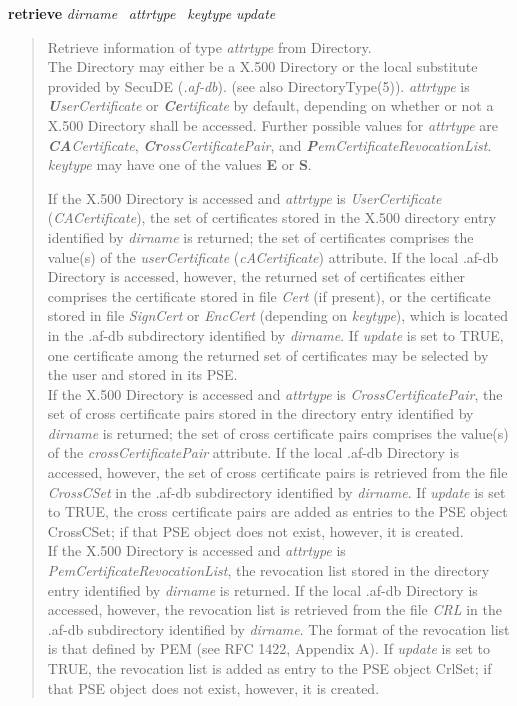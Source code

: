 {\bf retrieve} {\em dirname}~ {\em attrtype}~ {\em keytype} {\em update}
\begin{quote}
Retrieve information of type {\em attrtype} from Directory. \\
The Directory may either be a X.500 Directory or the local substitute provided by 
SecuDE ({\em .af-db}). (see also DirectoryType(5)).
{\em attrtype} is {\em {\bf U}serCertificate} or {\em {\bf Ce}rtificate} by default, depending on whether
or not a X.500 Directory shall be accessed. Further possible values for {\em attrtype} are
{\em {\bf CA}Certificate}, {\em {\bf Cr}ossCertificatePair}, and {\em {\bf P}emCertificateRevocationList}.
{\em keytype} may have one of the values {\bf E} or {\bf S}.
 
If the X.500 Directory is accessed and {\em attrtype} is {\em UserCertificate} ({\em CACertificate}), 
the set of certificates 
stored in the X.500 directory entry identified by {\em dirname} is returned; the set of 
certificates comprises the value(s) of the {\em userCertificate} ({\em cACertificate}) attribute. 
If the local .af-db Directory is accessed, however, the returned set of certificates either comprises
the certificate stored in file {\em Cert} (if present), or the certificate stored in file 
{\em SignCert} or {\em EncCert} (depending on {\em keytype}), which is located in 
the .af-db subdirectory identified by {\em dirname}.
If {\em update} is set to TRUE, one certificate among the returned set of certificates may
be selected by the user and stored in its PSE.\\
If the X.500 Directory is accessed and {\em attrtype} is {\em CrossCertificatePair}, 
the set of cross certificate 
pairs stored in the directory entry identified by {\em dirname} is returned; the set of 
cross certificate pairs comprises the value(s) of the {\em crossCertificatePair} attribute. 
If the local .af-db Directory is accessed, however, the set of cross certificate pairs is retrieved
from the file {\em CrossCSet} in the .af-db subdirectory identified by {\em dirname}.
If {\em update} is set to TRUE, the cross certificate pairs are added as entries 
to the PSE object CrossCSet; if that PSE object does not exist, however, it is created. \\
If the X.500 Directory is accessed and {\em attrtype} is {\em PemCertificateRevocationList}, 
the revocation list stored 
in the directory entry identified by {\em dirname} is returned. 
If the local .af-db Directory is accessed, however, the revocation list is retrieved from the
file {\em CRL} in the .af-db subdirectory identified by {\em dirname}.
The format of the revocation list is that defined by PEM (see RFC 1422, Appendix A). 
If {\em update} is set to TRUE, the revocation list is added as entry to the 
PSE object CrlSet; if that PSE object does not exist, however, it is created.
\end{quote}

